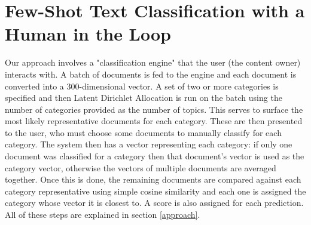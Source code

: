 \documentclass{article} %
\begin{document}
\section{Few-Shot Text Classification with a Human in the Loop}
Our approach involves a "classification engine" that the user (the content owner) interacts with. A batch of documents is fed to the engine and each document is converted into a 300-dimensional vector. A set of two or more categories is specified and then Latent Dirichlet Allocation is run on the batch using the number of categories provided as the number of topics. This serves to surface the most likely representative documents for each category. These are then presented to the user, who must choose some documents to manually classify for each category. The system then has a vector representing each category: if only one document was classified for a category then that document's vector is used as the category vector, otherwise the vectors of multiple documents are averaged together. Once this is done, the remaining documents are compared against each category representative using simple cosine similarity and each one is assigned the category whose vector it is closest to. A score is also assigned for each prediction. All of these steps are explained in section \ref{approach}.











\end{document}
